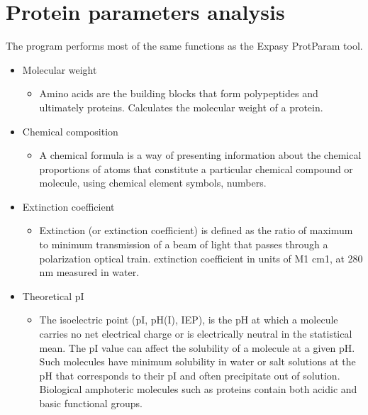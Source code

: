 \documentclass[letterpaper,10pt,english]{jupyterBook}
\begin{document}
\chapter{Protein parameters analysis}
\label{\detokenize{ipynb/chapter1:protein-parameters-analysis}}\label{\detokenize{ipynb/chapter1::doc}}
\sphinxAtStartPar
The program performs most of the same functions as the Expasy ProtParam tool.
\begin{itemize}
\item {} 
\sphinxAtStartPar
Molecular weight
\begin{itemize}
\item {} 
\sphinxAtStartPar
Amino acids are the building blocks that form polypeptides and ultimately proteins. Calculates the molecular weight of a protein.

\end{itemize}

\item {} 
\sphinxAtStartPar
Chemical composition
\begin{itemize}
\item {} 
\sphinxAtStartPar
A chemical formula is a way of presenting information about the chemical proportions of atoms that constitute a particular chemical compound or molecule, using chemical element symbols, numbers.

\end{itemize}

\item {} 
\sphinxAtStartPar
Extinction coefficient
\begin{itemize}
\item {} 
\sphinxAtStartPar
Extinction (or extinction coefficient) is defined as the ratio of maximum to minimum transmission of a beam of light that passes through a polarization optical train. extinction coefficient in units of  M\sphinxhyphen{}1 cm\sphinxhyphen{}1, at 280 nm measured in water.

\end{itemize}

\item {} 
\sphinxAtStartPar
Theoretical pI
\begin{itemize}
\item {} 
\sphinxAtStartPar
The isoelectric point (pI, pH(I), IEP), is the pH at which a molecule carries no net electrical charge or is electrically neutral in the statistical mean. The pI value can affect the solubility of a molecule at a given pH. Such molecules have minimum solubility in water or salt solutions at the pH that corresponds to their pI and often precipitate out of solution. Biological amphoteric molecules such as proteins contain both acidic and basic functional groups.


\end{itemize}
\end{itemize}
\end{document}
